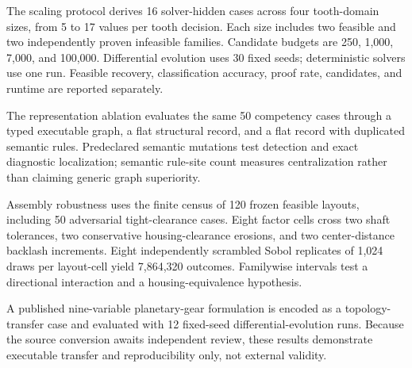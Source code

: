 \documentclass[preprint,12pt]{elsarticle}
\begin{document}
The scaling protocol derives 16 solver-hidden cases across four tooth-domain sizes, from 5 to 17 values per tooth decision. Each size includes two feasible and two independently proven infeasible families. Candidate budgets are 250, 1,000, 7,000, and 100,000. Differential evolution uses 30 fixed seeds; deterministic solvers use one run. Feasible recovery, classification accuracy, proof rate, candidates, and runtime are reported separately.

The representation ablation evaluates the same 50 competency cases through a typed executable graph, a flat structural record, and a flat record with duplicated semantic rules. Predeclared semantic mutations test detection and exact diagnostic localization; semantic rule-site count measures centralization rather than claiming generic graph superiority.

Assembly robustness uses the finite census of 120 frozen feasible layouts, including 50 adversarial tight-clearance cases. Eight factor cells cross two shaft tolerances, two conservative housing-clearance erosions, and two center-distance backlash increments. Eight independently scrambled Sobol replicates of 1,024 draws per layout-cell yield 7,864,320 outcomes. Familywise intervals test a directional interaction and a housing-equivalence hypothesis.

A published nine-variable planetary-gear formulation is encoded as a topology-transfer case and evaluated with 12 fixed-seed differential-evolution runs. Because the source conversion awaits independent review, these results demonstrate executable transfer and reproducibility only, not external validity.
\end{document}
